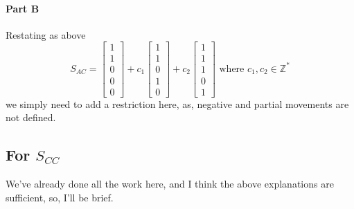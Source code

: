 \documentclass{article}
\begin{document}
            \paragraph{Part B}
                Restating as above
                \[
                S_{AC}=
                \begin{bmatrix}1\\1\\0\\0\\0\end{bmatrix}
                +
                c_1\begin{bmatrix}1\\1\\0\\1\\0\end{bmatrix}
                +
                c_2\begin{bmatrix}1\\1\\1\\0\\1\end{bmatrix}
                \text{ where }
                c_1, c_2 \in \mathbb{Z}^{*}
                \]
                we simply need to add a restriction here, as,
                negative and partial movements are not defined.
        \subsection[Composing C to C]{For $S_{CC}$}
            We've already done all the work here, and I think the above
            explanations are sufficient, so, I'll be brief.
\end{document}
